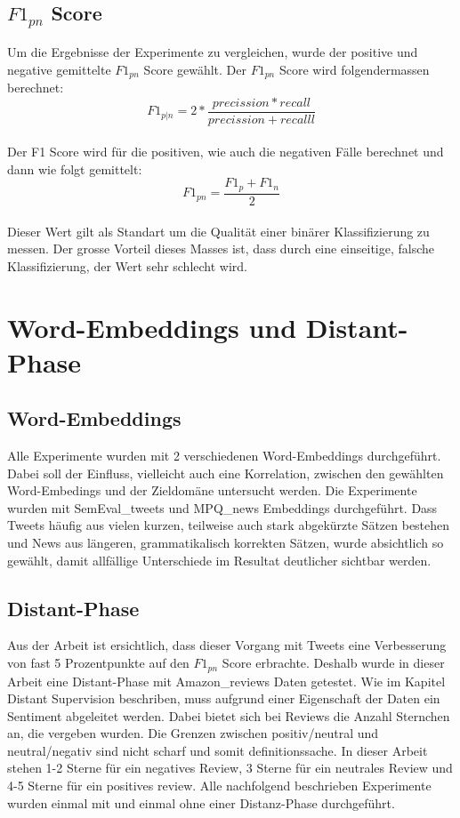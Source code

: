 \subsection{$F1_{pn}$ Score}
Um die Ergebnisse der Experimente zu vergleichen, wurde der positive und negative gemittelte $F1_{pn}$ Score gewählt. 
Der $F1_{pn}$ Score wird folgendermassen berechnet:\\
\begin{equation}
F1_{p|n} = 2*\frac{precission*recall}{precission+recalll}
\end{equation}\\
Der F1 Score wird für die positiven, wie auch die negativen Fälle berechnet und dann wie folgt gemittelt:\\
\begin{equation}
F1_{pn} = \frac{F1_p+F1_n}{2}
\end{equation}\\
Dieser Wert gilt als Standart um die Qualität einer binärer  Klassifizierung zu messen. Der grosse Vorteil dieses Masses ist, dass durch eine einseitige, falsche Klassifizierung, der Wert sehr schlecht wird.
\section{Word-Embeddings und Distant-Phase}
\subsection{Word-Embeddings}
Alle Experimente wurden mit 2 verschiedenen Word-Embeddings durchgeführt. Dabei soll der Einfluss, vielleicht auch eine Korrelation, zwischen den gewählten Word-Embedings und der Zieldomäne untersucht werden. Die Experimente wurden mit SemEval\_tweets und MPQ\_news Embeddings durchgeführt. Dass Tweets häufig aus vielen kurzen, teilweise auch stark abgekürzte Sätzen bestehen und News aus längeren, grammatikalisch korrekten Sätzen, wurde absichtlich so gewählt, damit allfällige Unterschiede im Resultat deutlicher sichtbar werden.
\subsection{Distant-Phase}
Aus der Arbeit \cite{deriu2016sentiment} ist ersichtlich, dass dieser Vorgang mit Tweets eine Verbesserung von fast 5 Prozentpunkte auf den $F1_{pn}$ Score erbrachte.
Deshalb wurde in dieser Arbeit eine Distant-Phase mit Amazon\_reviews Daten getestet. Wie im Kapitel Distant Supervision beschriben, muss aufgrund einer Eigenschaft der Daten ein Sentiment abgeleitet werden. Dabei bietet sich bei Reviews die Anzahl Sternchen an, die vergeben wurden. Die Grenzen zwischen positiv/neutral und neutral/negativ sind nicht scharf und somit definitionssache. In dieser Arbeit stehen 1-2 Sterne für ein negatives Review, 3 Sterne für ein neutrales Review und 4-5 Sterne für ein positives review.
Alle nachfolgend beschrieben Experimente wurden einmal mit und einmal ohne einer Distanz-Phase durchgeführt.

